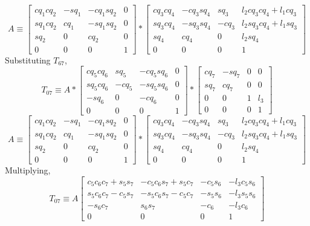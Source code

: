 \documentclass[12pt]{article}
\begin{document}
\[
  A \equiv
  \begin{bmatrix} cq_1cq_2 & -sq_1 & -cq_1sq_2 & 0 \\ sq_1cq_2 & cq_1 & -sq_1sq_2 & 0 \\ sq_2 & 0 & cq_2 & 0 \\ 0 & 0 & 0 & 1 \end{bmatrix}
  * \begin{bmatrix} cq_3cq_4 & -cq_3sq_4 & sq_3 & l_2cq_3cq_4 + l_1cq_3 \\ sq_3cq_4 & -sq_3sq_4 & -cq_3 & l_2sq_3cq_4 + l_1sq_3 \\ sq_4 & cq_4 & 0 & l_2sq_4 \\ 0 & 0 & 0 & 1 \end{bmatrix}
\]
Substituting $T_{67}$,
\[
  T_{07} \equiv
  A
  * \begin{bmatrix} cq_5cq_6 & sq_5 & -cq_5sq_6 & 0 \\ sq_5cq_6 & -cq_5 & -sq_5sq_6 & 0 \\ -sq_6 & 0 & -cq_6 & 0 \\ 0 & 0 & 0 & 1 \end{bmatrix}
  * \begin{bmatrix} cq_7 & -sq_7 & 0 & 0 \\ sq_7 & cq_7 & 0 & 0 \\ 0 & 0 & 1 & l_3 \\ 0 & 0 & 0 & 1 \end{bmatrix}
\]
\[
  A \equiv
  \begin{bmatrix} cq_1cq_2 & -sq_1 & -cq_1sq_2 & 0 \\ sq_1cq_2 & cq_1 & -sq_1sq_2 & 0 \\ sq_2 & 0 & cq_2 & 0 \\ 0 & 0 & 0 & 1 \end{bmatrix}
  * \begin{bmatrix} cq_3cq_4 & -cq_3sq_4 & sq_3 & l_2cq_3cq_4 + l_1cq_3 \\ sq_3cq_4 & -sq_3sq_4 & -cq_3 & l_2sq_3cq_4 + l_1sq_3 \\ sq_4 & cq_4 & 0 & l_2sq_4 \\ 0 & 0 & 0 & 1 \end{bmatrix}
\]
Multiplying,
\[
  T_{07} \equiv
  A
  \begin{bmatrix} c_5c_6c_7 + s_5s_7 & -c_5c_6s_7 + s_5c_7 & -c_5s_6 & -l_3c_5s_6 \\ s_5c_6c_7 - c_5s_7 & -s_5c_6s_7 - c_5c_7 & -s_5s_6 & -l_3s_5s_6 \\ -s_6c_7 & s_6s_7 & -c_6 & -l_3c_6 \\ 0 & 0 & 0 & 1 \end{bmatrix}
\]
\end{document}
